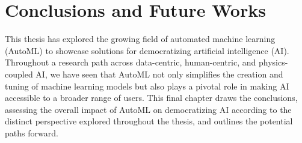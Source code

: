 \chapter{Conclusions and Future Works}
\label{epilogue:conclusions}



This thesis has explored the growing field of automated machine learning (AutoML) to showcase solutions for democratizing artificial intelligence (AI).
Throughout a research path across data-centric, human-centric, and physics-coupled AI, we have seen that AutoML not only simplifies the creation and tuning of machine learning models but also plays a pivotal role in making AI accessible to a broader range of users.
This final chapter draws the conclusions, assessing the overall impact of AutoML on democratizing AI according to the distinct perspective explored throughout the thesis,
and outlines the potential paths forward.



